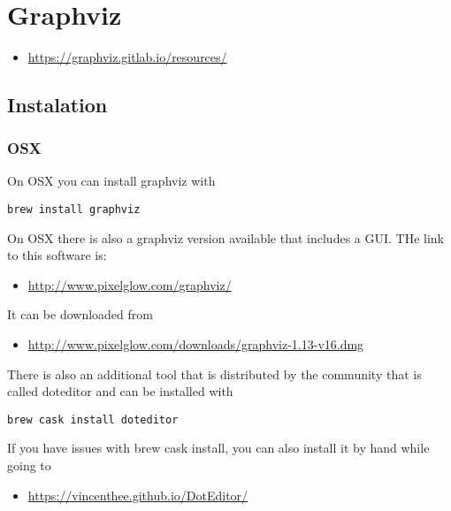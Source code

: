 \MDNAME\

\section{Graphviz}

\begin{itemize}
\item
  \url{https://graphviz.gitlab.io/resources/}
\end{itemize}

\subsection{Instalation}

\subsubsection{OSX}

On OSX you can install graphviz with

\begin{lstlisting}
brew install graphviz
\end{lstlisting}

On OSX there is also a graphviz version available that includes a GUI.
THe link to this software is:

\begin{itemize}
\item
  \url{http://www.pixelglow.com/graphviz/}
\end{itemize}

It can be downloaded from

\begin{itemize}
\item
  \url{http://www.pixelglow.com/downloads/graphviz-1.13-v16.dmg}
\end{itemize}

There is also an additional tool that is distributed by the community
that is called doteditor and can be installed with

\begin{lstlisting}
brew cask install doteditor
\end{lstlisting}

If you have issues with brew cask install, you can also install it by
hand while going to

\begin{itemize}
\item
  \url{https://vincenthee.github.io/DotEditor/}
\end{itemize}

